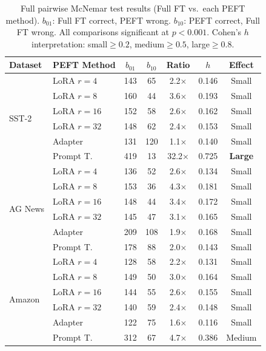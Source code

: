 \documentclass[conference]{IEEEtran}
\begin{document}
\begin{table}[ht]
\centering
\caption{Full pairwise McNemar test results (Full FT vs.\ each PEFT method). $b_{01}$: Full FT correct, PEFT wrong. $b_{10}$: PEFT correct, Full FT wrong. All comparisons significant at $p{<}0.001$. Cohen's $h$ interpretation: small${\geq}0.2$, medium${\geq}0.5$, large${\geq}0.8$.}
\label{tab:mcnemar_full}
\renewcommand{\arraystretch}{1.2}
\setlength{\tabcolsep}{3pt}
\begin{tabular}{llccccc}
\toprule
\textbf{Dataset} & \textbf{PEFT Method} & $b_{01}$ & $b_{10}$ & \textbf{Ratio} & $h$ & \textbf{Effect}\\
\midrule
\multirow{6}{*}{SST-2}
 & LoRA $r{=}4$   & 143 & 65  & 2.2$\times$ & 0.146 & Small\\
 & LoRA $r{=}8$   & 160 & 44  & 3.6$\times$ & 0.193 & Small\\
 & LoRA $r{=}16$  & 152 & 58  & 2.6$\times$ & 0.162 & Small\\
 & LoRA $r{=}32$  & 148 & 62  & 2.4$\times$ & 0.153 & Small\\
 & Adapter        & 131 & 120 & 1.1$\times$ & 0.140 & Small\\
 & Prompt T.      & 419 & 13  & 32.2$\times$ & 0.725 & \textbf{Large}\\
\midrule
\multirow{6}{*}{AG News}
 & LoRA $r{=}4$   & 136 & 52  & 2.6$\times$ & 0.134 & Small\\
 & LoRA $r{=}8$   & 153 & 36  & 4.3$\times$ & 0.181 & Small\\
 & LoRA $r{=}16$  & 148 & 44  & 3.4$\times$ & 0.172 & Small\\
 & LoRA $r{=}32$  & 145 & 47  & 3.1$\times$ & 0.165 & Small\\
 & Adapter        & 209 & 108 & 1.9$\times$ & 0.168 & Small\\
 & Prompt T.      & 178 & 88  & 2.0$\times$ & 0.143 & Small\\
\midrule
\multirow{6}{*}{Amazon}
 & LoRA $r{=}4$   & 128 & 58  & 2.2$\times$ & 0.131 & Small\\
 & LoRA $r{=}8$   & 149 & 50  & 3.0$\times$ & 0.164 & Small\\
 & LoRA $r{=}16$  & 144 & 55  & 2.6$\times$ & 0.155 & Small\\
 & LoRA $r{=}32$  & 140 & 59  & 2.4$\times$ & 0.148 & Small\\
 & Adapter        & 122 & 75  & 1.6$\times$ & 0.116 & Small\\
 & Prompt T.      & 312 & 67  & 4.7$\times$ & 0.386 & Medium\\
\bottomrule
\end{tabular}
\end{table}
\end{document}
